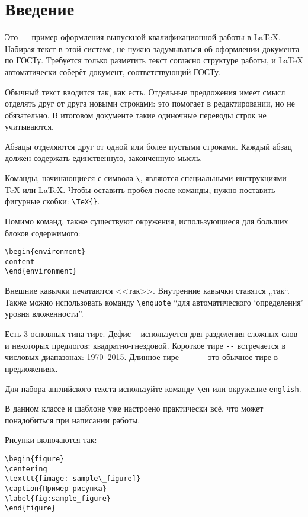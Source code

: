 \cleardoublepage
{}
{}
\chapter*{Введение}
\label{chap:introduction}

Это --- пример оформления выпускной квалификационной работы в \LaTeX.
Набирая текст в этой системе, не нужно задумываться об оформлении документа по ГОСТу.
Требуется только разметить текст согласно структуре работы, и \LaTeX{} автоматически соберёт документ, соответствующий ГОСТу.

Обычный текст вводится так, как есть.
Отдельные предложения имеет смысл отделять друг от друга новыми строками: это помогает в редактировании, но не обязательно.
В итоговом документе такие одиночные переводы строк не учитываются.

Абзацы отделяются друг от одной или более пустыми строками.
Каждый абзац должен содержать единственную, законченную мысль.

Команды, начинающиеся с символа \verb|\|, являются специальными инструкциями \TeX{} или \LaTeX.
Чтобы оставить пробел после команды, нужно поставить фигурные скобки: \verb|\TeX{}|.

Помимо команд, также существуют окружения, использующиеся для больших блоков содержимого:
\begin{verbatim}
\begin{environment}
content
\end{environment}
\end{verbatim}

Внешние кавычки печатаются <<так>>.
Внутренние кавычки ставятся ,,так``.
Также можно использовать команду \verb|\enquote| \enquote{для автоматического \enquote{определения} уровня вложенности}.

Есть 3 основных типа тире.
Дефис \verb|-| используется для разделения сложных слов и некоторых предлогов: квадратно-гнездовой.
Короткое тире \verb|--|  встречается в числовых диапазонах: 1970--2015.
Длинное тире \verb|---|  --- это обычное тире в предложениях.

Для набора английского текста используйте команду \verb|\en| или окружение \verb|english|.

В данном классе и шаблоне уже настроено практически всё, что может понадобиться при написании работы.

Рисунки включаются так:
\begin{verbatim}
\begin{figure}
\centering
\texttt{[image: sample\_figure]}
\caption{Пример рисунка}
\label{fig:sample_figure}
\end{figure}
\end{verbatim}

